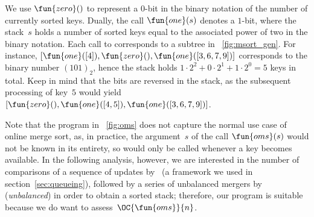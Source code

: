 We use \(\fun{zero}()\) to represent a
\(0\)-bit in the binary notation of the number of currently sorted
keys. Dually, the call \(\fun{one}(s)\) denotes
a \(1\)-bit, where the stack~\(s\) holds a number of sorted keys equal
to the associated power of two in the binary notation. Each call to
 corresponds to a subtree in
\fig~\vref{fig:msort_gen}. For instance, \([\fun{one}([4]),
\fun{zero}(), \fun{one}([3,6,7,9])]\) corresponds to the binary number
\((101)_2\), hence the stack holds \(1 \cdot 2^2 + 0 \cdot 2^1 + 1
\cdot 2^0 = 5\) keys in total. Keep in mind that the bits are reversed
in the stack, as the subsequent processing of key~\(5\) would yield
\([\fun{zero}(),\fun{one}([4,5]),\fun{one}([3,6,7,9])]\).

Note that the program in \fig~\vref{fig:oms} does not capture the
normal use case of online merge sort, as, in practice, the
argument~\(s\) of the call \(\fun{oms}(s)\)
would not be known in its entirety, so
 would only be called whenever a key
becomes available. In the following analysis, however, we are
interested in the number of comparisons of a sequence of updates
by~ (a framework we used in
section~\ref{sec:queueing}), followed by a series of unbalanced
mergers by~ (\emph{unbalanced}) in
order to obtain a sorted stack; therefore, our program is suitable
because we do want to assess~\(\OC{\fun{oms}}{n}\).

